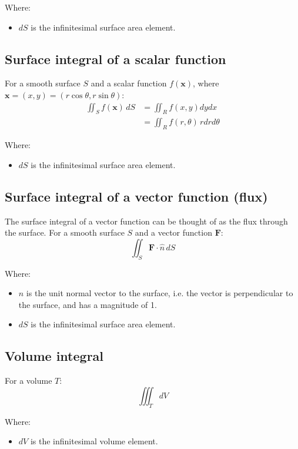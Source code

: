 \documentclass[11pt]{article}
\begin{document}
Where:
\begin{itemize}
\item \(dS\) is the infinitesimal surface area element.
\end{itemize}

\subsection{Surface integral of a scalar function}
\label{sec:orgf97a4f7}
For a smooth surface \(S\) and a scalar function \(f(\boldsymbol{x})\), where \(\boldsymbol{x} = (x, y) = (r \cos \theta, r \sin \theta)\):
\begin{align*}
\iint_S f(\boldsymbol{x}) \, dS &= \iint_R f(x, y) dy dx \\
&= \iint_R f(r, \theta) \, r dr d \theta
\end{align*}

Where:
\begin{itemize}
\item \(dS\) is the infinitesimal surface area element.
\end{itemize}

\subsection{Surface integral of a vector function (flux)}
\label{sec:org3670269}
The surface integral of a vector function can be thought of as the flux through the surface.
For a smooth surface \(S\) and a vector function \(\boldsymbol{F}\):
\[\iint_S \boldsymbol{F} \cdot \hat{n} \, dS\]

Where:
\begin{itemize}
\item \(\hat{n}\) is the unit normal vector to the surface, i.e. the vector is perpendicular to the surface, and has a magnitude of 1.
\item \(dS\) is the infinitesimal surface area element.
\end{itemize}

\subsection{Volume integral}
\label{sec:org9804fd7}
For a volume \(T\):
\[\iiint_T dV\]

Where:
\begin{itemize}
\item \(dV\) is the infinitesimal volume element.
\end{itemize}
\end{document}
